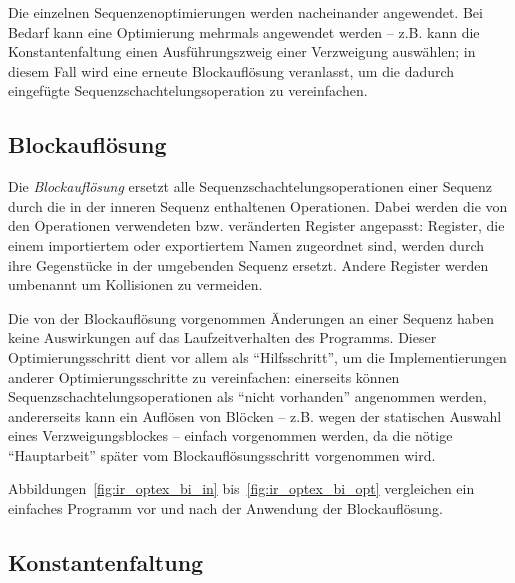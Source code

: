 \documentclass[twoside,a4paper,fleqn,12pt]{book}
\begin{document}
Die einzelnen Sequenzenoptimierungen werden nacheinander angewendet. Bei Bedarf kann eine
Optimierung mehrmals angewendet werden -- z.B. kann die Konstantenfaltung einen Ausführungszweig
einer Verzweigung auswählen; in diesem Fall wird eine erneute Blockauflösung veranlasst,
um die dadurch eingefügte Sequenzschachtelungsoperation zu vereinfachen.

\subsection{Blockauflösung}

Die \emph{Blockauflösung} ersetzt alle Sequenzschachtelungsoperationen einer Sequenz durch
die in der inneren Sequenz enthaltenen Operationen. Dabei werden die von den
Operationen verwendeten bzw. veränderten Register angepasst: Register, die einem importiertem
oder exportiertem Namen zugeordnet sind, werden durch ihre Gegenstücke in der umgebenden
Sequenz ersetzt. Andere Register werden umbenannt um Kollisionen zu vermeiden.

Die von der Blockauflösung vorgenommen Änderungen an einer Sequenz haben keine Auswirkungen auf das
Laufzeitverhalten des Programms. Dieser Optimierungsschritt dient vor allem als "`Hilfsschritt"',
um die Implementierungen anderer Optimierungsschritte zu vereinfachen: einerseits können
Sequenzschachtelungsoperationen als "`nicht vorhanden"' angenommen werden, andererseits kann
ein Auflösen von Blöcken -- z.B. wegen der statischen Auswahl eines Verzweigungsblockes --
einfach vorgenommen werden, da die nötige "`Hauptarbeit"' später vom Blockauflösungsschritt
vorgenommen wird.

Abbildungen~\ref{fig:ir_optex_bi_in} bis~\ref{fig:ir_optex_bi_opt} vergleichen ein einfaches Programm vor und nach der Anwendung der Blockauflösung.


\subsection{Konstantenfaltung}
\end{document}

